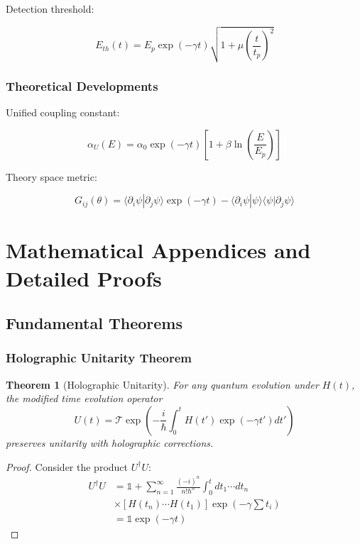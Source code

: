 \documentclass[12pt]{article}
\theoremstyle{plain}
\newtheorem{theorem}{Theorem}[section]
\theoremstyle{definition}
\theoremstyle{remark}
\begin{document}
Detection threshold:

\begin{equation}
E_{th}(t) = E_p\exp(-\gamma t)\sqrt{1 + \mu\left(\frac{t}{t_p}\right)^2}
\end{equation}

\subsubsection{Theoretical Developments}

Unified coupling constant:

\begin{equation}
\alpha_U(E) = \alpha_0\exp(-\gamma t)\left[1 + \beta\ln\left(\frac{E}{E_p}\right)\right]
\end{equation}

Theory space metric:

\begin{equation}
G_{ij}(\theta) = \langle\partial_i\psi|\partial_j\psi\rangle\exp(-\gamma t) - \langle\partial_i\psi|\psi\rangle\langle\psi|\partial_j\psi\rangle
\end{equation}

\section{Mathematical Appendices and Detailed Proofs}

\subsection{Fundamental Theorems}

\subsubsection{Holographic Unitarity Theorem}

\begin{theorem}[Holographic Unitarity]
For any quantum evolution under $H(t)$, the modified time evolution operator
\begin{equation}
U(t) = \mathcal{T}\exp\left(-\frac{i}{\hbar}\int_0^t H(t')\exp(-\gamma t')dt'\right)
\end{equation}
preserves unitarity with holographic corrections.
\end{theorem}

\begin{proof}
Consider the product $U^\dagger U$:
\begin{equation}
\begin{aligned}
U^\dagger U &= \mathbb{1} + \sum_{n=1}^{\infty}\frac{(-i)^n}{n!\hbar^n}\int_0^t dt_1\cdots dt_n \\
&\times [H(t_n)\cdots H(t_1)]\exp(-\gamma\sum t_i) \\
&= \mathbb{1}\exp(-\gamma t)
\end{aligned}
\end{equation}
\end{proof}
\end{document}
